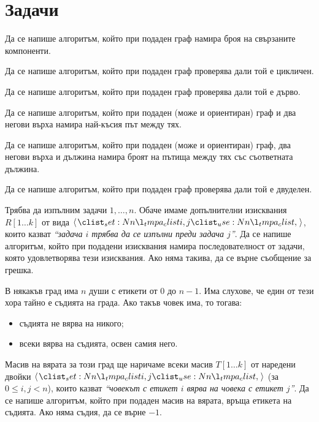 
\section{Задачи}

\begin{problem}
Да се напише алгоритъм, който при подаден граф намира броя на свързаните компоненти.
\end{problem}

\begin{problem}
Да се напише алгоритъм, който при подаден граф проверява дали той е цикличен.
\end{problem}

\begin{problem}
Да се напише алгоритъм, който при подаден граф проверява дали той е дърво.
\end{problem}

\begin{problem}
Да се напише алгоритъм, който при подаден (може и ориентиран) граф и два негови върха намира най-късия път между тях.
\end{problem}

\begin{problem}
Да се напише алгоритъм, който при подаден (може и ориентиран) граф, два негови върха и дължина намира броят на пътища между тях със съответната дължина.
\end{problem}

\begin{problem}
Да се напише алгоритъм, който при подаден граф проверява дали той е двуделен.
\end{problem}

\begin{problem}
Трябва да изпълним задачи $1, \dots, n$.
Обаче имаме допълнителни изисквания $R[1 \dots k]$ от вида $\opair{i, j}$, които казват \textit{``задача $i$ трябва да се изпълни преди задача $j$''}.
Да се напише алгоритъм, който при подадени изисквания намира последователност от задачи, която удовлетворява тези изисквания.
Ако няма такива, да се върне съобщение за грешка.
\end{problem}

\begin{problem}
В някакъв град има $n$ души с етикети от $0$ до $n - 1$.
Има слухове, че един от тези хора тайно е съдията на града.
Ако такъв човек има, то тогава:
\begin{itemize}
    \item съдията не вярва на никого;
    \item всеки вярва на съдията, освен самия него.
\end{itemize}
Масив на вярата за този град ще наричаме всеки масив $T[1 \dots k]$ от наредени двойки $\opair{i, j}$ (за $0 \leq i, j < n$), които казват \textit{``човекът с етикет $i$ вярва на човека с етикет $j$''}.
Да се напише алгоритъм, който при подаден масив на вярата, връща етикета на съдията.
Ако няма съдия, да се върне $-1$.
\end{problem}

